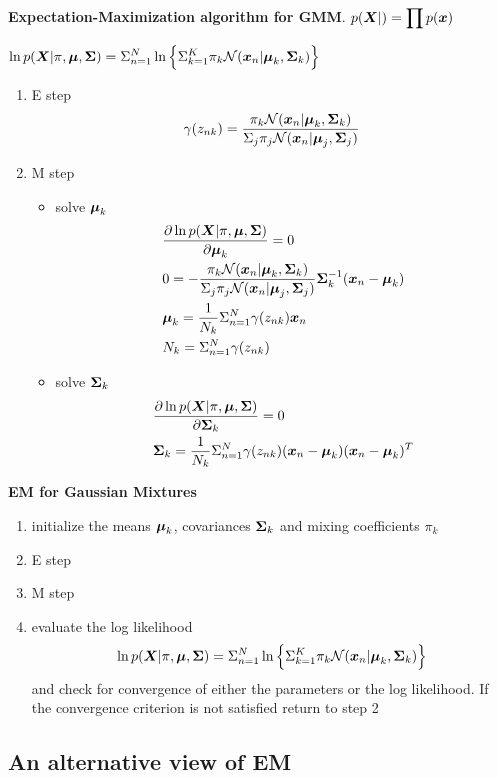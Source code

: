 \documentclass[11pt]{article}
\begin{document}
\textbf{Expectation-Maximization algorithm for GMM}. 
\(p(\boldsymbol{X}|)=\displaystyle\prod p(\boldsymbol{x})\)

\(\ln p(\boldsymbol{X}|\pi,\boldsymbol{\mu}, \boldsymbol{\Sigma})=\displaystyle\Sigma_{n=1}^N\ln\left\{
   \displaystyle\Sigma_{k=1}^K\pi_k\mathcal{N}(\boldsymbol{x}_n|\boldsymbol{\mu}_k,\boldsymbol{\Sigma}_k)\right\}\)
\begin{enumerate}
\item E step
\begin{equation*}
\gamma(z_{nk})=\frac{\pi_k\mathcal{N}(\boldsymbol{x}_n|\boldsymbol{\mu}_k,\boldsymbol{\Sigma}_k)}
{\displaystyle\Sigma_j\pi_j\mathcal{N}(\boldsymbol{x}_n|\boldsymbol{\mu}_j,\boldsymbol{\Sigma}_j)}
\end{equation*}
\item M step
\begin{itemize}
\item solve \(\boldsymbol{\mu}_k\)
\begin{align*}
&\frac{\partial\ln p(\boldsymbol{X}|\pi,\boldsymbol{\mu},\boldsymbol{\Sigma})}{\partial\boldsymbol{\mu}_k}=0\\
&0=-\frac{\pi_k\mathcal{N}(\boldsymbol{x}_n|\boldsymbol{\mu}_k,\boldsymbol{\Sigma}_k)}
{\displaystyle\Sigma_j\pi_j\mathcal{N}(\boldsymbol{x}_n|\boldsymbol{\mu}_j,\boldsymbol{\Sigma}_j)}\boldsymbol{\Sigma}_k^{-1}(\boldsymbol{x}_n-\boldsymbol{\mu}_k)\\
&\boldsymbol{\mu}_k=\frac{1}{N_k}\displaystyle\Sigma_{n=1}^N\gamma(z_{nk})\boldsymbol{x}_n\\
&N_k=\displaystyle\Sigma_{n=1}^N\gamma(z_{nk})
\end{align*}
\item solve \(\boldsymbol{\Sigma}_k\)
\begin{align*}
&\frac{\partial\ln p(\boldsymbol{X}|\pi,\boldsymbol{\mu},\boldsymbol{\Sigma})}{\partial\boldsymbol{\Sigma}_k}=0\\
&\boldsymbol{\Sigma}_k=\frac{1}{N_k}\displaystyle\Sigma_{n=1}^N\gamma(z_{nk})(\boldsymbol{x}_n-\boldsymbol{\mu}_k)(\boldsymbol{x}_n-\boldsymbol{\mu}_k)^T
\end{align*}
\end{itemize}
\end{enumerate}


\textbf{EM for Gaussian Mixtures}
\begin{enumerate}
\item initialize the means \(\boldsymbol{\mu}_k\), covariances \(\boldsymbol{\Sigma}_k\) and mixing
coefficients \(\pi_k\)
\item E step
\item M step
\item evaluate the log likelihood
\begin{equation*}
\ln p(\boldsymbol{X}|\pi,\boldsymbol{\mu}, \boldsymbol{\Sigma})=\displaystyle\Sigma_{n=1}^N\ln\left\{
\displaystyle\Sigma_{k=1}^K\pi_k\mathcal{N}(\boldsymbol{x}_n|\boldsymbol{\mu}_k,\boldsymbol{\Sigma}_k)\right\}
\end{equation*}
and check for convergence of either the parameters or the log likelihood.
If the convergence criterion is not satisfied return to step 2
\end{enumerate}
\subsection{An alternative view of EM}
\label{sec:orgf62dca0}
\end{document}

